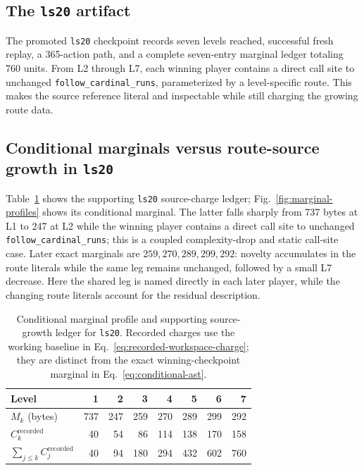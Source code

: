 \documentclass[11pt]{article}
\theoremstyle{definition}
\theoremstyle{remark}
\begin{document}
\subsection{The \texttt{ls20} artifact}
The promoted \texttt{ls20} checkpoint records seven levels reached, successful fresh
replay, a 365-action path, and a complete seven-entry marginal ledger totaling 760
units. From L2 through L7, each winning player contains a direct call site to unchanged
\texttt{follow\_cardinal\_runs}, parameterized by a level-specific route. This makes the
source reference literal and inspectable while still charging the growing route data.

\subsection{Conditional marginals versus route-source growth in \texttt{ls20}}
Table~\ref{tab:marg} shows the supporting \texttt{ls20} source-charge ledger;
Fig.~\ref{fig:marginal-profiles} shows its conditional marginal. The latter
falls sharply from 737 bytes at L1 to 247 at L2 while the
winning player contains a direct call site to unchanged \texttt{follow\_cardinal\_runs}; this is a
coupled complexity-drop and static call-site case. Later exact marginals are
\(259,270,289,299,292\): novelty accumulates in the route literals while the same leg
remains unchanged, followed by a small L7 decrease. Here the shared leg is named
directly in each later player, while the changing route literals account for
the residual description.

\begin{table}[t]
\centering
\small
\begin{tabular}{@{}lrrrrrrr@{}}
\toprule
Level & 1 & 2 & 3 & 4 & 5 & 6 & 7 \\
\midrule
$M_k$ (bytes) & 737 & 247 & 259 & 270 & 289 & 299 & 292 \\
$C_k^{\mathrm{recorded}}$ & 40 & 54 & 86 & 114 & 138 & 170 & 158 \\
$\sum_{j\le k}C_j^{\mathrm{recorded}}$ & 40 & 94 & 180 & 294 & 432 & 602 & 760 \\
\bottomrule
\end{tabular}
\caption{Conditional marginal profile and supporting source-growth ledger for
\texttt{ls20}. Recorded charges use the working baseline in
Eq.~\eqref{eq:recorded-workspace-charge}; they are distinct from
the exact winning-checkpoint marginal in Eq.~\eqref{eq:conditional-ast}.}
\label{tab:marg}
\end{table}
\end{document}
